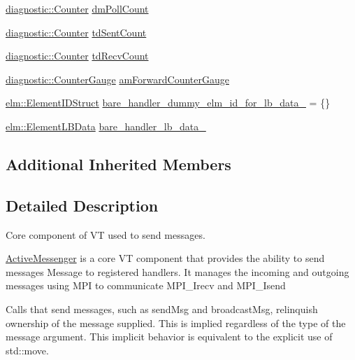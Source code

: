 \begin{DoxyCompactItemize}
\item 
\hyperlink{namespacevt_1_1diagnostic_a55fcc9d6ffa285d1b085c01df2507d2f}{diagnostic\+::\+Counter} \hyperlink{structvt_1_1messaging_1_1_active_messenger_abb8fb58c74b059143a49fc18140c62f6}{dm\+Poll\+Count}
\item 
\hyperlink{namespacevt_1_1diagnostic_a55fcc9d6ffa285d1b085c01df2507d2f}{diagnostic\+::\+Counter} \hyperlink{structvt_1_1messaging_1_1_active_messenger_a8b33706c08e1f3475b504040cac79fc7}{td\+Sent\+Count}
\item 
\hyperlink{namespacevt_1_1diagnostic_a55fcc9d6ffa285d1b085c01df2507d2f}{diagnostic\+::\+Counter} \hyperlink{structvt_1_1messaging_1_1_active_messenger_a313a1560507175413727fed0464f0b9d}{td\+Recv\+Count}
\item 
\hyperlink{namespacevt_1_1diagnostic_a95e27dc4e2a74cef48e2cf82a3c5cb36}{diagnostic\+::\+Counter\+Gauge} \hyperlink{structvt_1_1messaging_1_1_active_messenger_a3f7864f87ef5d5aa841fa04bb4ab3fb8}{am\+Forward\+Counter\+Gauge}
\item 
\hyperlink{structvt_1_1elm_1_1_element_i_d_struct}{elm\+::\+Element\+I\+D\+Struct} \hyperlink{structvt_1_1messaging_1_1_active_messenger_aafc3fafa7dd26af3db14c9514f7a69be}{bare\+\_\+handler\+\_\+dummy\+\_\+elm\+\_\+id\+\_\+for\+\_\+lb\+\_\+data\+\_\+} = \{\}
\item 
\hyperlink{structvt_1_1elm_1_1_element_l_b_data}{elm\+::\+Element\+L\+B\+Data} \hyperlink{structvt_1_1messaging_1_1_active_messenger_a81c1445908fe33e56d859073edc09534}{bare\+\_\+handler\+\_\+lb\+\_\+data\+\_\+}
\end{DoxyCompactItemize}
\subsection*{Additional Inherited Members}


\subsection{Detailed Description}
Core component of VT used to send messages. 

\hyperlink{structvt_1_1messaging_1_1_active_messenger}{Active\+Messenger} is a core VT component that provides the ability to send messages {\ttfamily Message} to registered handlers. It manages the incoming and outgoing messages using M\+PI to communicate {\ttfamily M\+P\+I\+\_\+\+Irecv} and {\ttfamily M\+P\+I\+\_\+\+Isend} 

Calls that send messages, such as {\ttfamily send\+Msg} and {\ttfamily broadcast\+Msg}, relinquish ownership of the message supplied. This is implied regardless of the type of the message argument. This implicit behavior is equivalent to the explicit use of {\ttfamily std\+::move}.

